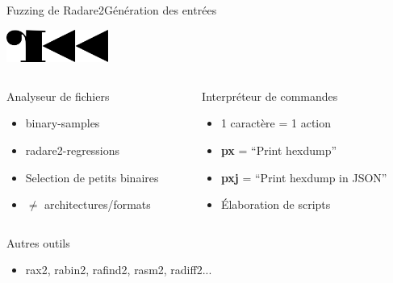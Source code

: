 \begin{frame}[fragile]{Fuzzing de Radare2}{Génération des entrées}
  \begin{center}
    \includegraphics[width=0.25\textwidth, clip=true]{../medias/radare2-logo.png}
    \vspace{-0.2cm}
  \end{center}
  \begin{columns}[T]
    \begin{column}{0.44\linewidth}

      \begin{block}{Analyseur de fichiers}
        \begin{itemize}
        \item{binary-samples}
        \item{radare2-regressions}
        \item{Selection de petits binaires}
        \item{$\ne$ architectures/formats}
        \end{itemize}
      \end{block}
    \end{column}

    \begin{column}{0.44\linewidth}
      \begin{block}{Interpréteur de commandes}
        \begin{itemize}
        \item{1 caractère = 1 action}
        \item{\textbf{px} = ``Print hexdump''}
        \item{\textbf{pxj} = ``Print hexdump in JSON''}
        \item{Élaboration de scripts}
        \end{itemize}
      \end{block}
    \end{column}
  \end{columns}
  \vfill
  \begin{exampleblock}{Autres outils}
    \begin{itemize}
    \item{rax2, rabin2, rafind2, rasm2, radiff2...}
    \end{itemize}
  \end{exampleblock}
\end{frame}

